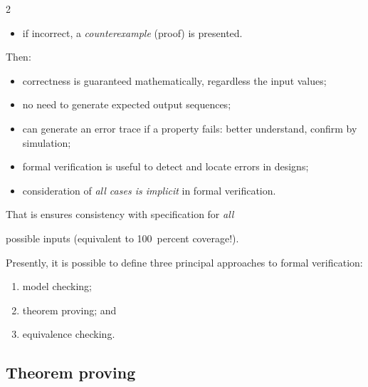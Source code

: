 \begin{multicols}{2}
\begin{itemize}
\item if incorrect, a \textit{counterexample} (proof) is presented.


\end{itemize}


   Then:


   \begin{itemize}


\item correctness is guaranteed mathematically, regardless the input values;


\item no need to generate expected output sequences;


\item can generate an error trace if a property fails: better understand, confirm by simulation;


\item formal verification is useful to detect and locate errors in designs;


\item consideration of \textit{all cases is implicit} in formal verification.


   \end{itemize}


   That is ensures consistency with specification for \textit{all}


possible inputs (equivalent to 100~percent coverage!).





   Presently, it is possible to define three principal approaches to formal verification:


\begin{enumerate}[(1)]


\item model checking;


\item  theorem proving; and


\item equivalence checking.


\end{enumerate}





\subsection{Theorem proving} %






\end{multicols}
